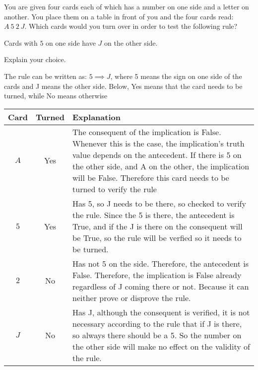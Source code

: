 \documentclass[addpoints]{exam}
\begin{document}
\begin{questions}
\question[5] You are given four cards each of which has a number on one side and a letter on another. You place them on a table in front of you and the four cards read: $A\ 5\ 2\ J$. Which cards would you turn over in order to test the following rule? 
  \begin{center}
    Cards with $5$ on one side have $J$ on the other side.
  \end{center}
  Explain your choice.
  \begin{solution}
    The rule can be written as: $5 \implies J$, where 5 means the sign on one side of the cards
    and J means the other side. 
    Below, Yes means that the card needs to be turned, while No means otherwise
    \begin{tabularx}{\textwidth}{c|c|X}
      Card & Turned & Explanation \\\hline\hline
      $A$ & Yes & The consequent of the implication is False. \newline Whenever this is the case, the implication's truth \newline value depends on the antecedent. If there is 5 on the \newline other side, and A on the other, the implication will \newline be False. Therefore this card needs to be turned to \newline verify the rule\\\hline
      $5$ & Yes & Has 5, so J needs to be there, so checked to verify the \newline rule. Since the 5 is there, the antecedent is True, and \newline if the J is there on the consequent will be True, \newline so the rule will be verfied so it needs to be turned.\\\hline
      $2$ & No & Has not 5 on the side. Therefore, the antecedent is False. \newline Therefore, the implication is False already regardless \newline of J coming there or not. Because it can neither \newline prove or disprove the rule.\\\hline
      $J$ & No & Has J, although the consequent is verified, it is not \newline necessary according to the rule that if J is there, so \newline always there should be a 5. So the number on the \newline other side will make no effect on the validity of the \newline rule.
    \end{tabularx}
    

\end{solution}
\end{questions}
\end{document}
